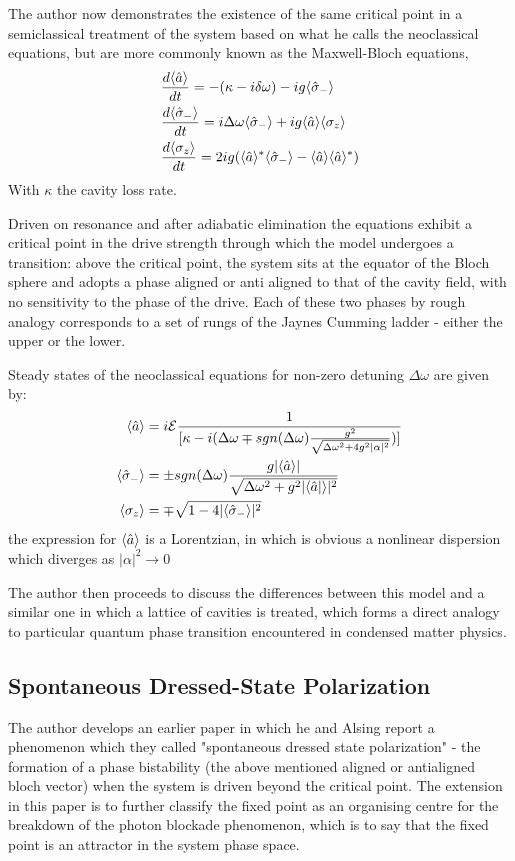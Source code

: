 The author now demonstrates the existence of the same critical point in a semiclassical treatment of the system based on what he calls the neoclassical equations, but are more commonly known as the Maxwell-Bloch equations, 
\begin{align}
	&\frac{d \langle \hat{a} \rangle}{dt} = -(\kappa -i \delta \omega)-ig \langle \hat{\sigma}_- \rangle \\
	&\frac{d \langle \hat{\sigma}_- \rangle}{dt} = i \Delta \omega \langle \hat{\sigma}_- \rangle +ig \langle \hat{a} \rangle \langle \sigma_z \rangle \\	
	&\frac{d \langle \sigma_z \rangle}{dt} = 2 i g(\langle \hat{a} \rangle^* \langle \hat{\sigma}_- \rangle -\langle \hat{a} \rangle \langle \hat{a} \rangle^*)
\end{align}
With $\kappa$ the cavity loss rate.

Driven on resonance and after adiabatic elimination the equations exhibit a critical point in the drive strength through which the model undergoes a transition: above the critical point, the system sits at the equator of the Bloch sphere and adopts a phase aligned or anti aligned to that of the cavity field, with no sensitivity to the phase of the drive. Each of these two phases by rough analogy corresponds to a set of rungs of the Jaynes Cumming ladder - either the upper or the lower. 

Steady states of the neoclassical equations for non-zero detuning $\Delta \omega$ are given by:
\begin{align}
	\langle \hat{a} \rangle& = i \mathcal{E}\frac{1}{[\kappa-i(\Delta \omega \mp sgn(\Delta \omega) \frac{g^2}{\sqrt{\Delta \omega^2 +4g^2 |\alpha|^2}})]} \\
	\langle \hat{\sigma}_- \rangle& = \pm sgn(\Delta \omega) \frac{g |\langle \hat{a} \rangle|}{\sqrt{\Delta \omega^2 + g^2 |\langle \hat{a}| \rangle|^2}}\\
	\langle \sigma_z \rangle& = \mp \sqrt{1-4|\langle \hat{\sigma}_- \rangle|^2}
\end{align}
the expression for $\langle \hat{a} \rangle$ is a Lorentzian, in which is obvious a nonlinear dispersion which diverges as $|\alpha|^2 \rightarrow 0$

The author then proceeds to discuss the differences between this model and a similar one in which a lattice of cavities is treated, which forms a direct analogy to particular quantum phase transition encountered in condensed matter physics.

\subsection{Spontaneous Dressed-State Polarization}

The author develops an earlier paper \autocite{Alsing1999} in which he and Alsing report a phenomenon which they called "spontaneous dressed state polarization" - the formation of a phase bistability (the above mentioned aligned or antialigned bloch vector) when the system is driven beyond the critical point. The extension in this paper is to further classify the fixed point as an organising centre for the breakdown of the photon blockade phenomenon, which is to say that the fixed point is an attractor in the system phase space. 

